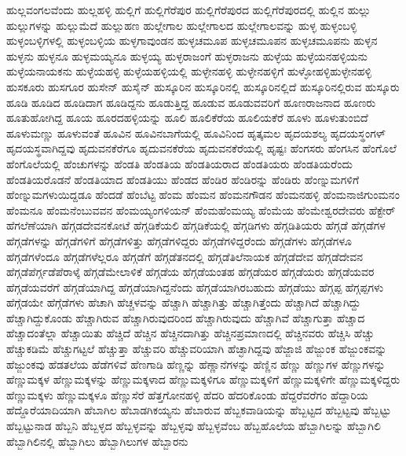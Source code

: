 {ಹುಲ್ಲವಂಗಲವೆಂದು
ಹುಲ್ಲಹಳ್ಳಿ
ಹುಲ್ಲಿಗೆ
ಹುಲ್ಲಿಗೆರೆಪುರ
ಹುಲ್ಲಿಗೆರೆಪುರದ
ಹುಲ್ಲಿಗೆರೆಪುರದಲ್ಲಿ
ಹುಲ್ಲಿನ
ಹುಲ್ಲು
ಹುಲ್ಲುಗಳನ್ನು
ಹುಲ್ಲುಮೆದೆ
ಹುಲ್ಲುಹಣ
ಹುಲ್ಲೇಗಾಲ
ಹುಲ್ಲೇಗಾಲದ
ಹುಲ್ಲೇಗಾಲವನ್ನು
ಹುಳ್ಳ
ಹುಳ್ಳಂಬಳ್ಳಿ
ಹುಳ್ಳಂಬಳ್ಳಿಗಳಲ್ಲಿ
ಹುಳ್ಳಂಬಳ್ಳಿಯ
ಹುಳ್ಳಗಾವುಂಡನ
ಹುಳ್ಳಚಮೂಪ
ಹುಳ್ಳಚಮೂಪನ
ಹುಳ್ಳಚಮೂಪನು
ಹುಳ್ಳನ
ಹುಳ್ಳನು
ಹುಳ್ಳನೂ
ಹುಳ್ಳಮಯ್ಯನೂ
ಹುಳ್ಳಯ್ಯ
ಹುಳ್ಳರಾಜಂಗೆ
ಹುಳ್ಳರಾಜನು
ಹುಳ್ಳೆಯ
ಹುಳ್ಳೆಯನಹಳ್ಳಿಯನು
ಹುಳ್ಳೆಯನಾಯಕನು
ಹುಳ್ಳೆಯಹಳ್ಳಿ
ಹುಳ್ಳೆಯಹಳ್ಳಿಯಲ್ಲಿ
ಹುಳ್ಳೇನಹಳ್ಳಿ
ಹುಳ್ಳೇನಹಳ್ಳಿಗೆ
ಹುಳ್ಳೋಹಳ್ಳಿಹುಳ್ಳೇನಹಳ್ಳಿ
ಹುಸಕೂರು
ಹುಸಗೂರ
ಹುಸೇನ್
ಹುಸೈನ್
ಹುಸ್ಕೂರಿನ
ಹುಸ್ಕೂರಿನಲ್ಲಿ
ಹುಸ್ಕೂರಿನಲ್ಲಿದೆ
ಹುಸ್ಕೂರಿನಲ್ಲಿರುವ
ಹುಸ್ಕೂರು
ಹೂಡಿ
ಹೂಡಿದ
ಹೂಡಿದಾಗ
ಹೂಡಿದ್ದನು
ಹೂಡುತ್ತಿದ್ದ
ಹೂಡುವ
ಹೂಡುವವರಿಗೆ
ಹೂಣರಾಜನಾದ
ಹೂಣರು
ಹೂತುಹೋಗಿದ್ದ
ಹೂಯ
ಹೂರದಹಳ್ಳಿಯನ್ನು
ಹೂಲಿ
ಹೂಲಿಕೆರೆಯ
ಹೂಲಿಯಕೆರೆ
ಹೂಳು
ಹೂಳುತುಂಬಿದೆ
ಹೂಳುಮಣ್ಣು
ಹೂಳುವಂತೆ
ಹೂವಿನ
ಹೂವಿನಬಾಗೆಯಲ್ಲಿ
ಹೂವಿನಿಂದ
ಹೃತ್ಕಮಲ
ಹೃದಯಶಲ್ಯ
ಹೃದಯಸ್ಥಂಗಳ್
ಹೃದಯಸ್ಥವಾಗಿದ್ದವು
ಹೃದುವನಕೆರೆಗೂ
ಹೃದುವನಕೆರೆಯ
ಹೃದುವನಕೆರೆಯಲ್ಲಿ
ಹೃಷ್ಟಃ
ಹೆಂಗಸರು
ಹೆಂಗಸಿನ
ಹೆಂಗೊಲೆ
ಹೆಂಗೊಲೆಯಲ್ಲಿ
ಹೆಂಚುಗಳನ್ನು
ಹೆಂಡತಿ
ಹೆಂಡತಿಯ
ಹೆಂಡತಿಯರಾದ
ಹೆಂಡತಿಯರು
ಹೆಂಡತಿಯರೆಂದು
ಹೆಂಡತಿಯರೊಡನೆ
ಹೆಂಡತಿಯಾದ
ಹೆಂಡತಿಯು
ಹೆಂಡದ
ಹೆಂಡಿರ
ಹೆಂಡಿರನ್ನು
ಹೆಂಡಿರು
ಹೆಂಣ್ನುಮಗಳಿಗೆ
ಹೆಂಣ್ನುಮಗಳುಯಿದ್ದಡೂ
ಹೆಂದಡೆ
ಹೆಂಬೆಟ್ಟ
ಹೆಂಮ
ಹೆಂಮನ
ಹೆಂಮನಗೌಡನ
ಹೆಂಮನಹಳ್ಳಿ
ಹೆಂಮನಾಜಿಗುಂಮನಂ
ಹೆಂಮನೂ
ಹೆಂಮನೆಂಬುವವನ
ಹೆಂಮಯ್ಯಂಗಳಿಯನ್
ಹೆಂಮಹೆಂಮಯ್ಯ
ಹೆಂಮೆಯ
ಹೆಂಮೇಶ್ವರದೇವರು
ಹೆಕ್ಟೇರ್
ಹೆಗಲೆಣೆಯಾಗಿ
ಹೆಗ್ಗಡದೇವನಕೋಟೆ
ಹೆಗ್ಗಡಿಕೆಯಲಿ
ಹೆಗ್ಗಡಿಕೆಯಲ್ಲಿ
ಹೆಗ್ಗಡಿಗಳು
ಹೆಗ್ಗಡಿತಿಯರು
ಹೆಗ್ಗಡೆ
ಹೆಗ್ಗಡೆಗಳ
ಹೆಗ್ಗಡೆಗಳನ್ನು
ಹೆಗ್ಗಡೆಗಳಿಗೆ
ಹೆಗ್ಗಡೆಗಳಿತ್ತು
ಹೆಗ್ಗಡೆಗಳಿದ್ದರು
ಹೆಗ್ಗಡೆಗಳಿದ್ದರೆಂದು
ಹೆಗ್ಗಡೆಗಳು
ಹೆಗ್ಗಡೆಗಳೂ
ಹೆಗ್ಗಡೆಗಳೆಂದೂ
ಹೆಗ್ಗಡೆಗಳೆಲ್ಲರೂ
ಹೆಗ್ಗಡೆಗೆ
ಹೆಗ್ಗಡೆತನದಲ್ಲಿ
ಹೆಗ್ಗಡೆತಿಲೆನಾಯಕ
ಹೆಗ್ಗಡೆದೇವ
ಹೆಗ್ಗಡೆದೇವನ
ಹೆಗ್ಗಡೆಪೆರ್ಗ್ಗಡೆಪೆರಾಳ್ಕೆ
ಹೆಗ್ಗಡೆಮೇಲಾಳಿಕೆ
ಹೆಗ್ಗಡೆಯ
ಹೆಗ್ಗಡೆಯಂತಹ
ಹೆಗ್ಗಡೆಯರ
ಹೆಗ್ಗಡೆಯರು
ಹೆಗ್ಗಡೆಯವರ
ಹೆಗ್ಗಡೆಯವರೆಗೆ
ಹೆಗ್ಗಡೆಯಾಗಿದ್ದ
ಹೆಗ್ಗಡೆಯಾಗಿದ್ದನೆಂದು
ಹೆಗ್ಗಡೆಯಾಗಿರಬಹುದು
ಹೆಗ್ಗಡೆಯು
ಹೆಗ್ಗಪ್ಪ
ಹೆಗ್ಗಪ್ಪಗಳು
ಹೆಗ್ಗೆಡಯೇ
ಹೆಗ್ಗೆಡೆಗಳು
ಹೆಚಾಗಿ
ಹೆಚ್ಚಳವನ್ನು
ಹೆಚ್ಚಾಗಿ
ಹೆಚ್ಚಾಗಿತ್ತು
ಹೆಚ್ಚಾಗಿತ್ತೆಂದು
ಹೆಚ್ಚಾಗಿದೆ
ಹೆಚ್ಚಾಗಿದ್ದು
ಹೆಚ್ಚಾಗಿದ್ದುಕೊಂಡು
ಹೆಚ್ಚಾಗಿರುವ
ಹೆಚ್ಚಾಗಿರುವುದರಿಂದ
ಹೆಚ್ಚಾಗಿರುವುದು
ಹೆಚ್ಚಾಗಿವೆ
ಹೆಚ್ಚಾಗುತ್ತಾ
ಹೆಚ್ಚಾದ
ಹೆಚ್ಚಾದಂತೆಲ್ಲಾ
ಹೆಚ್ಚಾಯಿತು
ಹೆಚ್ಚಿದೆ
ಹೆಚ್ಚಿನ
ಹೆಚ್ಚಿನದಾಗಿತ್ತು
ಹೆಚ್ಚಿನಪ್ರಮಾಣದಲ್ಲಿ
ಹೆಚ್ಚಿನವರು
ಹೆಚ್ಚಿಸಿ
ಹೆಚ್ಚು
ಹೆಚ್ಚುಕಡಿಮೆ
ಹೆಚ್ಚುಗಟ್ಟಲೆ
ಹೆಚ್ಚುತ್ತಾ
ಹೆಚ್ಚುವರಿ
ಹೆಚ್ಚುವರಿಯಾಗಿ
ಹೆಚ್ಛಾಗಿದ್ದವು
ಹೆಜ್ಜಾಜಿ
ಹೆಜ್ಜುಂಕ
ಹೆಜ್ಜುಂಕವನ್ನು
ಹೆಜ್ಜುಂಕವು
ಹೆಡತಲೆಯ
ಹೆಡೆಗಳಿವೆ
ಹೆಣಗಾಡಿ
ಹೆಣ್ಣನ್ನು
ಹೆಣ್ಣಾನೆಗಳನ್ನು
ಹೆಣ್ಣಿನ
ಹೆಣ್ಣು
ಹೆಣ್ಣುಗಳ
ಹೆಣ್ಣುಗಳನ್ನು
ಹೆಣ್ಣುಮಕ್ಕಳ
ಹೆಣ್ಣುಮಕ್ಕಳನ್ನು
ಹೆಣ್ಣುಮಕ್ಕಳಾದ
ಹೆಣ್ಣುಮಕ್ಕಳಿಗೂ
ಹೆಣ್ಣುಮಕ್ಕಳಿಗೆ
ಹೆಣ್ಣುಮಕ್ಕಳಿಗೇ
ಹೆಣ್ಣುಮಕ್ಕಳಿದ್ದರು
ಹೆಣ್ಣುಮಕ್ಕಳು
ಹೆಣ್ಣುಮಕ್ಕಳೂ
ಹೆಣ್ಣುಸೆರೆ
ಹೆತ್ತಗೋನಹಳ್ಳಿ
ಹೆದರಿ
ಹೆದರಿಕೊಂಡು
ಹೆದ್ದರೆವರೆಗಂ
ಹೆದ್ದಾರಿಯ
ಹೆದ್ದೊರೆಯಾದಿಯಾಗಿ
ಹೆಬಾಗಿಲ
ಹೆಬಾಡಗಿಕಯ್ಯನು
ಹೆಬಾರುವ
ಹೆಬ್ಬಕವಾಡಿಯನ್ನು
ಹೆಬ್ಬಟ್ಟದ
ಹೆಬ್ಬಟ್ಟವು
ಹೆಬ್ಬಟ್ಟು
ಹೆಬ್ಬಟ್ಟುನಾಡ
ಹೆಬ್ಬನಿ
ಹೆಬ್ಬಳ್ಳದ
ಹೆಬ್ಬಳ್ಳವನ್ನು
ಹೆಬ್ಬಳ್ಳವು
ಹೆಬ್ಬಳ್ಳವೆಂಬ
ಹೆಬ್ಬಹೊಲೆಯ
ಹೆಬ್ಬಾಗಿಲನ್ನು
ಹೆಬ್ಬಾಗಿಲಿ
ಹೆಬ್ಬಾಗಿಲಿನಲ್ಲಿ
ಹೆಬ್ಬಾಗಿಲು
ಹೆಬ್ಬಾಗಿಲುಗಳ
ಹೆಬ್ಬಾರನು
}
